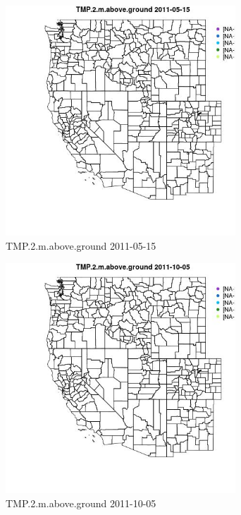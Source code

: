 \begin{figure} 
\centering  
\includegraphics[width=0.77\textwidth]{Code_Outputs/ML_input_report_ML_input_PM25_Step5_part_d_de_duplicated_aves_ML_input_MapObsTMP2maboveground2011-05-15.jpg} 
\caption{\label{fig:ML_input_report_ML_input_PM25_Step5_part_d_de_duplicated_aves_ML_inputMapObsTMP2maboveground2011-05-15}TMP.2.m.above.ground 2011-05-15} 
\end{figure} 
 

\begin{figure} 
\centering  
\includegraphics[width=0.77\textwidth]{Code_Outputs/ML_input_report_ML_input_PM25_Step5_part_d_de_duplicated_aves_ML_input_MapObsTMP2maboveground2011-10-05.jpg} 
\caption{\label{fig:ML_input_report_ML_input_PM25_Step5_part_d_de_duplicated_aves_ML_inputMapObsTMP2maboveground2011-10-05}TMP.2.m.above.ground 2011-10-05} 
\end{figure} 
 

